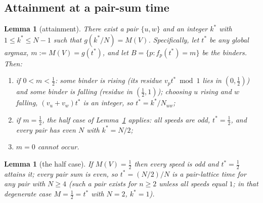 \documentclass[11pt,a4paper]{article}
\numberwithin{equation}{section}
\theoremstyle{plain}
\newtheorem{lemma}[theorem]{Lemma}
\theoremstyle{definition}
\theoremstyle{remark}
\begin{document}
\subsection{Attainment at a pair-sum time}

\begin{lemma}[attainment]\label{lem:attainment}
There exist a pair $\{u,w\}$ and an integer $k^\ast$ with
$1\le k^\ast\le N-1$ such that $g(k^\ast/N)=M(V)$. Specifically, let
$t^\ast$ be any global argmax, $m:=M(V)=g(t^\ast)$, and let
$B=\{p: f_p(t^\ast)=m\}$ be the binders. Then:
\begin{enumerate}[leftmargin=1.8em,itemsep=1pt]
\item[(a)] if $0<m<\tfrac12$: some binder is \emph{rising} (its residue
  $v_p t^\ast\bmod 1$ lies in $(0,\tfrac12)$) and some binder is
  \emph{falling} (residue in $(\tfrac12,1)$); choosing $u$ rising and $w$
  falling, $(v_u+v_w)t^\ast$ is an integer, so
  $t^\ast=k^\ast/N_{uw}$;
\item[(b)] if $m=\tfrac12$, the half case of
Lemma~\ref{lem:halfcase} applies: all speeds are odd, $t^\ast=\tfrac12$,
and every pair has even $N$ with $k^\ast=N/2$;
\item[(c)] $m=0$ cannot occur.
\end{enumerate}
\end{lemma}

\begin{lemma}[the half case]\label{lem:halfcase}
If $M(V)=\tfrac12$ then every speed is odd and $t^\ast=\tfrac12$
attains it; every pair sum is even, so $t^\ast=(N/2)/N$ is a
pair-lattice time for any pair with $N\ge 4$ (such a pair exists for
$n\ge2$ unless all speeds equal $1$; in that degenerate case
$M=\tfrac12=t^\ast$ with $N=2$, $k^\ast=1$).
\end{lemma}
\end{document}
